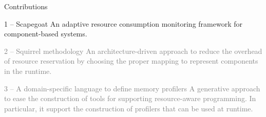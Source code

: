 \documentclass[10pt,xcolor={dvipsnames}]{beamer}
\begin{document}
	\begin{frame}{Contributions}
			
			\begin{block}{{\large 1 -- Scapegoat}}
				An adaptive resource consumption monitoring framework for component-based systems.
			\end{block}
%			
%				
		
		\vspace{0.2cm}
			\begin{scriptsize}
				\begin{block}{\textcolor{gray}{2 -- Squirrel methodology}}
					\textcolor{gray}{An architecture-driven approach to reduce the overhead of resource reservation by choosing the proper mapping to represent components in the runtime.}
				\end{block}
				\begin{block}{\textcolor{gray}{3 -- A domain-specific language to define memory profilers}}
					\textcolor{gray}{A generative approach to ease the construction of tools for supporting resource-aware programming. In particular, it support the construction of profilers that can be used at runtime.}
				\end{block}
			\end{scriptsize}
			
%					
		
 	\end{frame}
	
\end{document}
